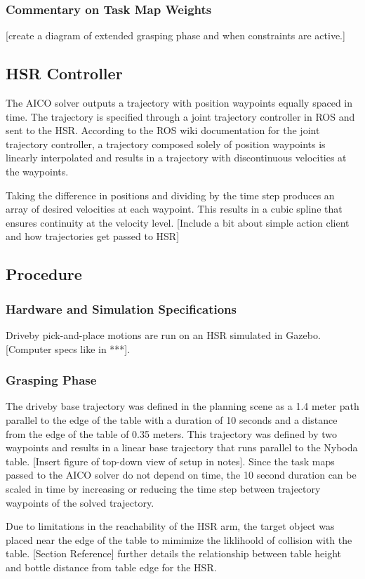 \documentclass[12pt]{article}
\begin{document}
            \subsubsection{Commentary on Task Map Weights}
                [create a diagram of extended grasping phase and when constraints are active.]
        \subsection{HSR Controller}
            The AICO solver outputs a trajectory with position waypoints equally spaced in time. The trajectory is specified through a joint trajectory controller in ROS and sent to the HSR. According to the ROS wiki documentation for the joint trajectory controller, a trajectory composed solely of position waypoints is linearly interpolated and results in a trajectory with discontinuous velocities at the waypoints. 
            \par Taking the difference in positions and dividing by the time step produces an array of desired velocities at each waypoint. This results in a cubic spline that ensures continuity at the velocity level.
            [Include a bit about simple action client and how trajectories get passed to HSR]
        \subsection{Procedure}
            \subsubsection{Hardware and Simulation Specifications}
                Driveby pick-and-place motions are run on an HSR simulated in Gazebo. [Computer specs like in ***].
                
            \subsubsection{Grasping Phase}
                The driveby base trajectory was defined in the planning scene as a 1.4 meter path parallel to the edge of the table with a duration of 10 seconds and a distance from the edge of the table of 0.35 meters. This trajectory was defined by two waypoints and results in a linear base trajectory that runs parallel to the Nyboda table. [Insert figure of top-down view of setup in notes]. Since the task maps passed to the AICO solver do not depend on time, the 10 second duration can be scaled in time by increasing or reducing the time step between trajectory waypoints of the solved trajectory.
                \par Due to limitations in the reachability of the HSR arm, the target object was placed near the edge of the table to mimimize the liklihoold of collision with the table. [Section Reference] further details the relationship between table height and bottle distance from table edge for the HSR.
\end{document}
